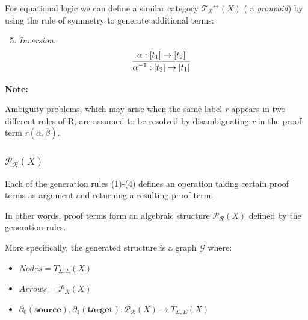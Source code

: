 \documentclass{beamer}
\begin{document}
\begin{frame}
    For equational logic we can define a similar category $\mathcal{T_R}^{\leftrightarrow}(X)$ ( a \emph{groupoid}) by using 
    the rule of symmetry to generate additional terms:
    
    \bigskip 
    {
    \scriptsize
    \begin{enumerate}
        \setcounter{enumi}{4}
        \item  \emph{Inversion}. 
        $$
        \infer[]{\alpha^{-1} : [t_2] \rightarrow [t_1]}{\alpha : [t_1] \rightarrow [t_2]}
        $$
    \end{enumerate}
    }

    \bigskip
    \pause 
    \textbf{Note:}

    Ambiguity problems, which may arise when  the same label \emph{r} appears in two different rules of R, are assumed 
    to be resolved by disambiguating \emph{r}  in the proof term $r(\overline{\alpha},\overline{\beta})$.
\end{frame}
\begin{frame}
    \frametitle{$\mathcal{P_R}(X)$}

    Each of the generation rules (1)-(4) defines an operation taking certain proof terms as argument and returning 
    a resulting proof term.

    \bigskip
    \pause 
    In other words, proof terms form an algebraic structure $\mathcal{P_R}(X)$ defined by the generation rules.

    \bigskip
    \pause 
    More specifically, the generated structure is a graph $\mathcal{G}$ where: 
    \begin{itemize}
        \item $Nodes = T_{\Sigma,E}(X)$
        \item $Arrows = \mathcal{P_R}(X)$
        \item $\partial_0 (\textbf{source}), \partial_1 (\textbf{target}) : \mathcal{P_R}(X) \rightarrow T_{\Sigma,E}(X)$
    \end{itemize}
\end{frame}
\end{document}
